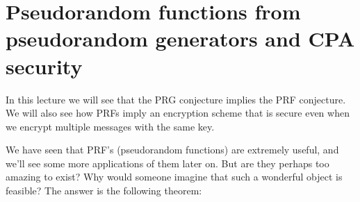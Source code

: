 \chapter{Pseudorandom functions from pseudorandom generators and CPA
security}\label{5-Pseudorandom-functions}

In this lecture we will see that the PRG conjecture implies the PRF
conjecture. We will also see how PRFs imply an encryption scheme that is
secure even when we encrypt multiple messages with the same key.

We have seen that PRF's (pseudorandom functions) are extremely useful,
and we'll see some more applications of them later on. But are they
perhaps too amazing to exist? Why would someone imagine that such a
wonderful object is feasible? The answer is the following theorem:

\hypertarget{prfthm}{}

